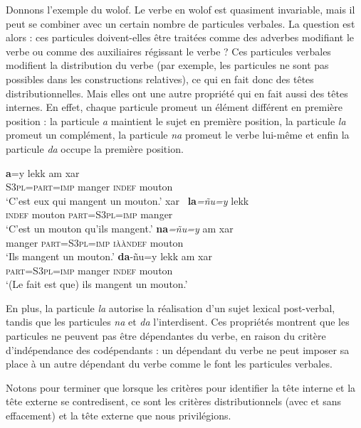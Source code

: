 Donnons l’exemple du wolof. Le verbe en wolof est quasiment invariable, mais il peut se combiner avec un certain nombre de particules verbales. La question est alors : ces particules doivent-elles être traitées comme des adverbes modifiant le verbe ou comme des auxiliaires régissant le verbe ? Ces particules verbales modifient la distribution du verbe (par exemple, les particules ne sont pas possibles dans les constructions relatives), ce qui en fait donc des têtes distributionnelles. Mais elles ont une autre propriété qui en fait aussi des têtes internes. En effet, chaque particule promeut un élément différent en première position : la particule \textit{a} maintient le sujet en première position, la particule \textit{la} promeut un complément, la particule \textit{na} promeut le verbe lui-même et enfin la particule \textit{da} occupe la première position.

\ea
\ea
{}\textbf{{a}}{=y}                {lekk}          {am}       {xar~}\\
\textsc{S3pl=part=imp} manger  \textsc{indef}  mouton\\
\glt `C’est eux qui mangent un mouton.’
\ex
{}       {xar~}          \textbf{{la}}\textit{=ñu=y}               {lekk}\\
\textsc{indef}  mouton  \textsc{part=S3pl=imp} manger\\
\glt `C’est un mouton qu’ils mangent.’
\ex
{}       \textbf{{na}}\textit{=ñu=y}             {am}       {xar~}\\
manger  \textsc{part=S3pl=imp} \textsc{iààndef}  mouton\\
\glt `Ils mangent un mouton.’
\ex
\gll \textbf{{da}}{{}-ñu=y              lekk         am      xar~}\\
\textsc{part=S3pl=imp} manger  \textsc{indef}  mouton\\
\glt `(Le fait est que) ils mangent un mouton.’
\z
\z

En plus, la particule \textit{la} autorise la réalisation d’un sujet lexical post-verbal, tandis que les particules \textit{na} et \textit{da} l’interdisent. Ces propriétés montrent que les particules ne peuvent pas être dépendantes du verbe, en raison du critère d’indépendance des codépendants : un dépendant du verbe ne peut imposer sa place à un autre dépendant du verbe comme le font les particules verbales.

Notons pour terminer que lorsque les critères pour identifier la tête interne et la tête externe se contredisent, ce sont les critères distributionnels (avec et sans effacement) et la tête externe que nous privilégions.

